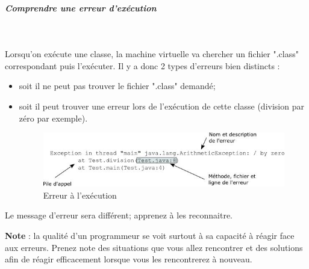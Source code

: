 \documentclass[a4paper,11pt]{article}
\begin{document}
			
			\subparagraph{Comprendre une erreur d'ex\'ecution} 
		
				\textcolor{white}{.} \par
			          Lorsqu'on ex\'ecute une classe, la machine virtuelle va chercher un fichier ".class" correspondant puis l'ex\'ecuter. Il y a donc 2 types d'erreurs bien distincts :  
        
           			 \par
        
				\begin{itemize}
					\item soit il ne peut pas trouver le fichier ".class" demand\'e;
					\item soit il peut trouver une erreur lors de l'ex\'ecution de cette classe (division par z\'ero par exemple).
            					\par
						\begin{figure}[hbt]
				    			\begin{center}
								\includegraphics[width=0.8\linewidth,height=0.8\textheight,keepaspectratio=true]{image/ErreurExec.jpg}
							\end{center}
                
                   				 \caption[Erreur \`a l'ex\'ecution]{Erreur \`a l'ex\'ecution}
                					\end{figure}
                    
				\end{itemize}
				  
          			Le message d'erreur sera diff\'erent; apprenez \`a les reconnaitre.   
        
           			 \par
       				 \textbf{Note} : la qualit\'e d'un programmeur se voit surtout \`a sa capacit\'e \`a r\'eagir face aux erreurs. 
          			Prenez note des situations que vous allez rencontrer et des solutions afin de r\'eagir efficacement lorsque vous les rencontrerez \`a nouveau.  
        
           			 \par
        
\end{document}
